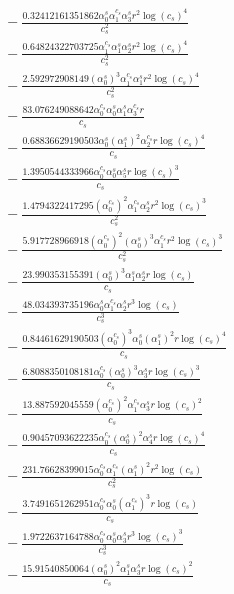 \documentclass[10pt]{article}
\begin{document}
\begin{align*}
&{}  - \frac{0.32412161351862 \alpha_{0}^s \alpha_{1}^{c_s} \alpha_{3}^s r^{2} \log{\left(c_{s} \right)}^{4}}{c_{s}^{2}} \\
&{}  - \frac{0.64824322703725 \alpha_{1}^{c_s} \alpha_{1}^s \alpha_{2}^s r^{2} \log{\left(c_{s} \right)}^{4}}{c_{s}^{2}} \\
&{}  - \frac{2.592972908149 \left(\alpha_{0}^s\right)^{3} \alpha_{1}^{c_s} \alpha_{1}^s r^{2} \log{\left(c_{s} \right)}^{4}}{c_{s}^{2}} \\
&{}  - \frac{83.076249088642 \alpha_{0}^{c_s} \alpha_{0}^s \alpha_{1}^s \alpha_{3}^{c_s} r}{c_{s}} \\
&{}  - \frac{0.68836629190503 \alpha_{0}^s \left(\alpha_{1}^s\right)^{2} \alpha_{2}^{c_s} r \log{\left(c_{s} \right)}^{4}}{c_{s}} \\
&{}  - \frac{1.3950544333966 \alpha_{0}^{c_s} \alpha_{0}^s \alpha_{5}^s r \log{\left(c_{s} \right)}^{3}}{c_{s}} \\
&{}  - \frac{1.4794322417295 \left(\alpha_{0}^{c_s}\right)^{2} \alpha_{1}^{c_s} \alpha_{2}^s r^{2} \log{\left(c_{s} \right)}^{3}}{c_{s}^{2}} \\
&{}  - \frac{5.917728966918 \left(\alpha_{0}^{c_s}\right)^{2} \left(\alpha_{0}^s\right)^{3} \alpha_{1}^{c_s} r^{2} \log{\left(c_{s} \right)}^{3}}{c_{s}^{2}} \\
&{}  - \frac{23.990353155391 \left(\alpha_{0}^s\right)^{3} \alpha_{1}^s \alpha_{2}^s r \log{\left(c_{s} \right)}}{c_{s}} \\
&{}  - \frac{48.034393735196 \alpha_{0}^s \alpha_{1}^{c_s} \alpha_{2}^s r^{3} \log{\left(c_{s} \right)}}{c_{s}^{3}} \\
&{}  - \frac{0.84461629190503 \left(\alpha_{0}^{c_s}\right)^{3} \alpha_{0}^s \left(\alpha_{1}^s\right)^{2} r \log{\left(c_{s} \right)}^{4}}{c_{s}} \\
&{}  - \frac{6.8088350108181 \alpha_{0}^{c_s} \left(\alpha_{0}^s\right)^{3} \alpha_{3}^s r \log{\left(c_{s} \right)}^{3}}{c_{s}} \\
&{}  - \frac{13.887592045559 \left(\alpha_{0}^{c_s}\right)^{2} \alpha_{1}^{c_s} \alpha_{3}^s r \log{\left(c_{s} \right)}^{2}}{c_{s}} \\
&{}  - \frac{0.90457093622235 \alpha_{0}^{c_s} \left(\alpha_{0}^s\right)^{2} \alpha_{4}^s r \log{\left(c_{s} \right)}^{4}}{c_{s}} \\
&{}  - \frac{231.76628399015 \alpha_{0}^{c_s} \alpha_{1}^{c_s} \left(\alpha_{1}^s\right)^{2} r^{2} \log{\left(c_{s} \right)}}{c_{s}^{2}} \\
&{}  - \frac{3.7491651262951 \alpha_{0}^{c_s} \alpha_{0}^s \left(\alpha_{1}^{c_s}\right)^{3} r \log{\left(c_{s} \right)}}{c_{s}} \\
&{}  - \frac{1.9722637164788 \alpha_{0}^{c_s} \alpha_{0}^s \alpha_{3}^s r^{3} \log{\left(c_{s} \right)}^{3}}{c_{s}^{3}} \\
&{}  - \frac{15.91540850064 \left(\alpha_{0}^s\right)^{2} \alpha_{1}^s \alpha_{3}^s r \log{\left(c_{s} \right)}^{2}}{c_{s}}
\end{align*}
\end{document}
